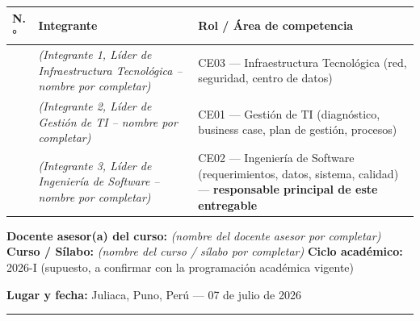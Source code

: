 \documentclass[11pt,a4paper]{article}
\begin{document}
{\small
\begin{longtable}[]{@{}
  >{\raggedright\arraybackslash}p{}
  >{\raggedright\arraybackslash}p{}
  >{\raggedright\arraybackslash}p{}@{}}
\toprule\noalign{}
\begin{minipage}[b]{\linewidth}\raggedright
N.°
\end{minipage} & \begin{minipage}[b]{\linewidth}\raggedright
Integrante
\end{minipage} & \begin{minipage}[b]{\linewidth}\raggedright
Rol / Área de competencia
\end{minipage} \\
\midrule\noalign{}
\endhead
\bottomrule\noalign{}
\endlastfoot
1 & \textit{(Integrante 1, Líder de Infraestructura Tecnológica -- nombre por completar)} & CE03 --- Infraestructura Tecnológica (red, seguridad, centro de datos) \\
2 & \textit{(Integrante 2, Líder de Gestión de TI -- nombre por completar)} & CE01 --- Gestión de TI (diagnóstico, business case, plan de gestión, procesos) \\
3 & \textit{(Integrante 3, Líder de Ingeniería de Software -- nombre por completar)} & CE02 --- Ingeniería de Software (requerimientos, datos, sistema, calidad) --- \textbf{responsable principal de este entregable} \\
\end{longtable}
}

\textbf{Docente asesor(a) del curso:} \textit{(nombre del docente asesor por completar)}
\textbf{Curso / Sílabo:} \textit{(nombre del curso / s\'ilabo por completar)}
\textbf{Ciclo académico:} 2026-I (supuesto, a confirmar con la programación académica vigente)

\textbf{Lugar y fecha:} Juliaca, Puno, Perú --- 07 de julio de 2026

\begin{center}\rule{0.5\linewidth}{0.5pt}\end{center}
\end{document}
